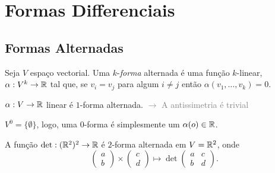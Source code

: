 \section{Formas Differenciais}


\subsection{Formas Alternadas}

\begin{definition}
    Seja \(V\) espaço vectorial. Uma $k$-\emph{forma} alternada é uma função \(k\)-linear, \(\alpha: V^k \to \mathbb{R}\) tal que, se \(v_i = v_j\) para algum \(i\neq j\) então \(\alpha(v_1, \ldots, v_k) = 0\). 
\end{definition}

\begin{example}
    \(\alpha: V \to \mathbb{R}\) linear é \(1\)-forma alternada. \textcolor{gray}{\(\rightarrow\) A antissimetria é trivial}
\end{example}

\begin{note}
    \(V^0 = \{\emptyset\}\), logo, uma $0$-forma é simplesmente um \(\alpha(o) \in \mathbb{R}\). 
\end{note}

\parbox[l]{0.7\linewidth}{

\begin{example}
    A função \(\det : (\mathbb{R}^2)^2 \to \mathbb{R}\) é \(2\)-forma alternada em \(V= \mathbb{R}^2\), onde 
    \[\begin{pmatrix}
        a \\ b
    \end{pmatrix}\times \begin{pmatrix}
        c \\ d
    \end{pmatrix} \mapsto \det\begin{pmatrix}
        a & c \\ 
        b & d
    \end{pmatrix}.\]  
\end{example}
}

